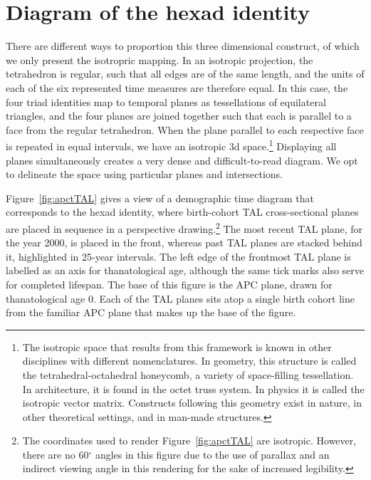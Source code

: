 \documentclass[12pt,oneside,a4paper]{article} %
\theoremstyle{definition}
\begin{document}
 \section{Diagram of the hexad identity}
 \label{sec:diagram}
 There are different ways to proportion this three dimensional construct,
of which we only present the isotropric mapping. In an isotropic projection, the
tetrahedron is regular, such that all edges are of the same length, and the
units of each of the six represented time measures are therefore equal. In this
case, the four triad identities map to temporal planes as tessellations of equilateral
triangles, and the four planes are joined together such that each is parallel to
a face from the regular tetrahedron. When the plane parallel to each
respective face is repeated in equal intervals, we have an isotropic 3d space.\footnote{The isotropic space that results from this
framework is known in other disciplines with different
nomenclatures. In geometry, this structure is called the
tetrahedral-octahedral honeycomb, a variety of space-filling tessellation. In
architecture, it is found in the octet truss system. In physics it is called
the isotropic vector matrix. Constructs following this geometry exist in nature,
in other theoretical settings, and in man-made structures.}
Displaying all planes simultaneously creates a very dense and difficult-to-read
diagram. We opt to delineate the space using particular planes and
intersections.

Figure~\ref{fig:apctTAL} gives a view of a demographic
time diagram that corresponds to the hexad identity, where birth-cohort TAL
cross-sectional planes are placed in sequence in a perspective drawing.\footnote{The coordinates used to render Figure~\ref{fig:apctTAL} are isotropic.
However, there are no 60$^\circ$ angles in this figure due to the use of
parallax and an indirect viewing angle in this rendering for the sake of
increased legibility.} The most recent TAL plane, for the year 2000, is placed
in the front, whereas past TAL planes are stacked behind it, highlighted in
25-year intervals. The left edge of the frontmost TAL plane is labelled as an
axis for thanatological age, although the same tick marks also serve for
completed lifespan.
The base of this figure is the APC plane, drawn for thanatological age 0.
Each of the TAL planes sits atop a single birth cohort line from the familiar APC plane that makes up the base of the figure.
\end{document}
